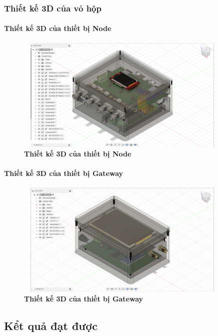 \documentclass{article} %
\begin{document}
	\subsubsection{Thiết kế 3D của vỏ hộp}
	
	\paragraph{Thiết kế 3D của thiết bị Node}\mbox{}
	
	\begin{figure}[!ht]
		\centering
		\includegraphics[width=10.4cm,height=5.5cm]{Images/Node3D.png}
		\caption[ Thiết kế 3D của thiết bị Node ]{\bfseries \fontsize{12pt}{0pt}\selectfont  Thiết kế 3D của thiết bị Node}
		\label{Node3D}
	\end{figure}
	
	\paragraph{Thiết kế 3D của thiết bị Gateway}\mbox{}
	
	\begin{figure}[!ht]
		\centering
		\includegraphics[width=10.4cm,height=5.5cm]{Images/Gateway3D.png}
		\caption[ Thiết kế 3D của thiết bị Gateway ]{\bfseries \fontsize{12pt}{0pt}\selectfont  Thiết kế 3D của thiết bị Gateway}
		\label{Gateway3D}
	\end{figure}
	\newpage
	\subsection{Kểt quả đạt được}
\end{document}
